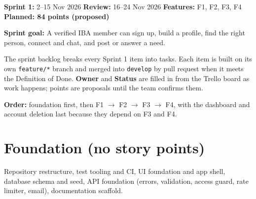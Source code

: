 \documentclass[10pt,a4paper]{article}
\begin{document}
\makedoctitle

\textbf{Sprint 1:} 2--15 Nov 2026 \quad \textbf{Review:} 16--24 Nov 2026 \quad \textbf{Features:} F1, F2, F3, F4 \quad \textbf{Planned: 84 points (proposed)}

\textbf{Sprint goal:} A verified IBA member can sign up, build a profile, find the right person, connect and chat, and post or answer a need.

The sprint backlog breaks every Sprint 1 item into tasks. Each item is built on its own \texttt{feature/*} branch and merged into \texttt{develop} by pull request when it meets the Definition of Done. \textbf{Owner} and \textbf{Status} are filled in from the Trello board as work happens; points are proposals until the team confirms them.

\textbf{Order:} foundation first, then F1 $\rightarrow$ F2 $\rightarrow$ F3 $\rightarrow$ F4, with the dashboard and account deletion last because they depend on F3 and F4.

\section*{Foundation (no story points)}
Repository restructure, test tooling and CI, UI foundation and app shell, database schema and seed, API foundation (errors, validation, access guard, rate limiter, email), documentation scaffold.
\end{document}
